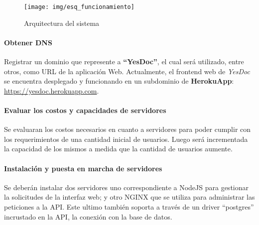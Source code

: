  \begin{figure}
  \centering
  \texttt{[image: img/esq\_funcionamiento]}
  \caption{Arquitectura del sistema}
  \label{esq_funcionamiento}
\end{figure}


\paragraph{Obtener DNS}

\begin{sloppypar}
Registrar un dominio que represente a \textbf{``YesDoc''}, el cual será utilizado, entre otros, como URL de la aplicación Web.
Actualmente, el frontend web de \textit{YesDoc} se encuentra desplegado y funcionando en un subdominio de \textbf{HerokuApp}: \url{https://yesdoc.herokuapp.com}.
\end{sloppypar}

\paragraph{Evaluar los costos y capacidades de servidores}
Se evaluaran los costos necesarios en cuanto a servidores para poder  cumplir con los requerimientos de una cantidad inicial de usuarios. Luego será incrementada la capacidad de los mismos a medida que la cantidad de usuarios aumente. 

\paragraph{Instalación y puesta en marcha de servidores}
Se deberán instalar dos servidores uno correspondiente a NodeJS para gestionar la solicitudes de la interfaz web; y otro NGINX
que se utiliza para administrar las peticiones a la API. Este ultimo también soporta a través de un driver ``postgres'' incrustado en la API, la conexión con la base de datos.

